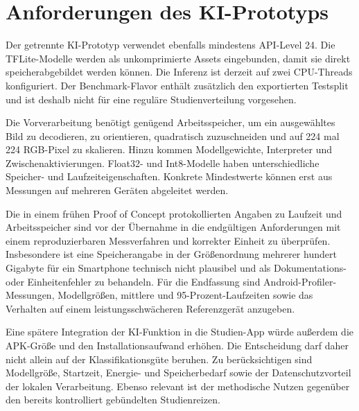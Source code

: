 \section{Anforderungen des KI-Prototyps}
Der getrennte KI-Prototyp verwendet ebenfalls mindestens API-Level 24. Die TFLite-Modelle werden als unkomprimierte Assets eingebunden, damit sie direkt speicherabgebildet werden können. Die Inferenz ist derzeit auf zwei CPU-Threads konfiguriert. Der Benchmark-Flavor enthält zusätzlich den exportierten Testsplit und ist deshalb nicht für eine reguläre Studienverteilung vorgesehen.

Die Vorverarbeitung benötigt genügend Arbeitsspeicher, um ein ausgewähltes Bild zu decodieren, zu orientieren, quadratisch zuzuschneiden und auf 224 mal 224 RGB-Pixel zu skalieren. Hinzu kommen Modellgewichte, Interpreter und Zwischenaktivierungen. Float32- und Int8-Modelle haben unterschiedliche Speicher- und Laufzeiteigenschaften. Konkrete Mindestwerte können erst aus Messungen auf mehreren Geräten abgeleitet werden.

Die in einem frühen Proof of Concept protokollierten Angaben zu Laufzeit und Arbeitsspeicher sind vor der Übernahme in die endgültigen Anforderungen mit einem reproduzierbaren Messverfahren und korrekter Einheit zu überprüfen. Insbesondere ist eine Speicherangabe in der Größenordnung mehrerer hundert Gigabyte für ein Smartphone technisch nicht plausibel und als Dokumentations- oder Einheitenfehler zu behandeln. Für die Endfassung sind Android-Profiler-Messungen, Modellgrößen, mittlere und 95-Prozent-Laufzeiten sowie das Verhalten auf einem leistungsschwächeren Referenzgerät anzugeben.

Eine spätere Integration der KI-Funktion in die Studien-App würde außerdem die APK-Größe und den Installationsaufwand erhöhen. Die Entscheidung darf daher nicht allein auf der Klassifikationsgüte beruhen. Zu berücksichtigen sind Modellgröße, Startzeit, Energie- und Speicherbedarf sowie der Datenschutzvorteil der lokalen Verarbeitung. Ebenso relevant ist der methodische Nutzen gegenüber den bereits kontrolliert gebündelten Studienreizen.
